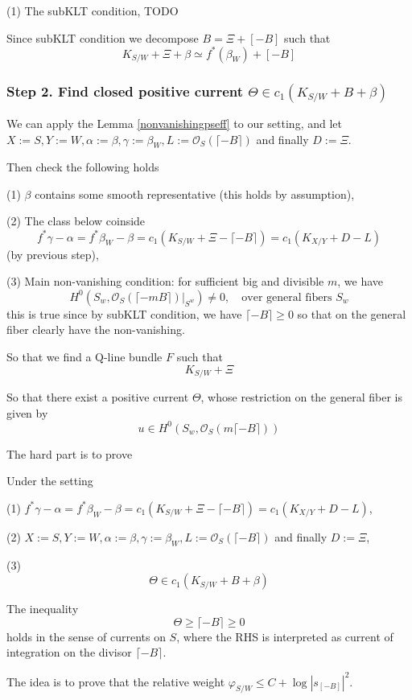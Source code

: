 \documentclass[11pt]{article}
\theoremstyle{definition}
\begin{document}
	
	(1) The subKLT condition, TODO
	
	Since subKLT condition we decompose $B = \Xi + [-B]$ such that $$\boxed{K_{S/W}+ \Xi  + \beta  \simeq f^*(\beta_W) + [-B]}$$
	
	\subsubsection{Step 2. Find closed positive current $\Theta  \in c_1(K_{S/W}+ B +\beta)$}
	We can apply the Lemma \ref{nonvanishingpseff} to our setting, and let  $X:=S, Y:=W, \alpha:=\beta, \gamma:=\beta_W, L:=\mathcal{O}_S(\lceil-B\rceil)$ and finally $D:=\Xi$. 
	
	
	Then check the following holds
	
	
	(1) $\beta$ contains some smooth representative (this holds by assumption),
	
	(2) The class below coinside $$f^* \gamma  - \alpha  = f^* \beta_W  - \beta   = c_1(K_{S/W} +\Xi  - \lceil{-B}\rceil) =  c_1(K_{X/Y}+D -L)$$(by previous step), 
	
	(3) Main non-vanishing condition: for sufficient big and divisible $m$, we have $$H^0(S_w,\mathcal{O}_S(\lceil{-mB}\rceil)|_{S^w})\ne 0,\quad \text{over general fibers }S_w$$this is true since by subKLT condition, we have $\lceil{-B}\rceil\ge 0$ so that on the general fiber clearly have the non-vanishing.
	
	So that we find a Q-line bundle $F$ such that $$K_{S/W}+ \Xi $$
	
	So that there exist a positive current $\Theta$, whose restriction on the general fiber is given by $$u \in H^0(S_w ,\mathcal{O}_S(m \lceil{-B}\rceil))$$
	
	The hard part is to prove 
	
	Under the setting 
	
	(1) $f^* \gamma  - \alpha  = f^* \beta_W  - \beta   = c_1(K_{S/W} +\Xi  - \lceil{-B}\rceil) =  c_1(K_{X/Y}+D -L)$,
	
	(2) $X:=S, Y:=W, \alpha:=\beta, \gamma:=\beta_W, L:=\mathcal{O}_S(\lceil-B\rceil)$ and finally $D:=\Xi$,
	
	(3) $$\Theta \in c_1(K_{S/W}+B+ \beta)$$
	
	
	The inequality
	$$
	\Theta \geq\lceil-B\rceil \ge 0
	$$
	holds in the sense of currents on $S$, where the RHS is interpreted as current of integration on the divisor $\lceil-B\rceil$.
	
	The idea is to prove that the relative weight $\varphi_{S/W}\le  C + \log |s_{[-B]}|^2$.
	
\end{document}
